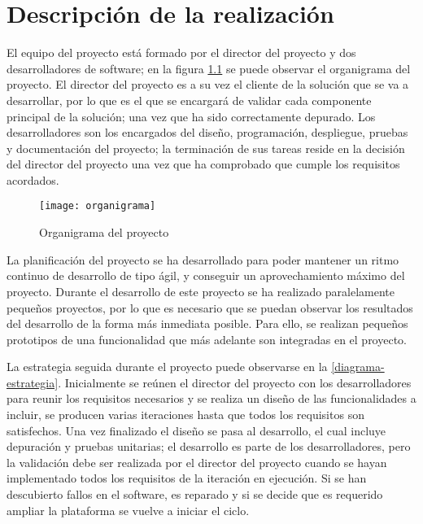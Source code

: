 \chapter{Descripción de la realización}
El equipo del proyecto está formado por el director del proyecto y dos
desarrolladores de software; en la figura \ref{fig:organigrama} se puede
observar el organigrama del proyecto. El director del proyecto es a su vez el
cliente de la solución que se va a desarrollar, por lo que es el que se
encargará de validar cada componente principal de la solución; una vez que ha
sido correctamente depurado. Los desarrolladores son los encargados del diseño,
programación, despliegue, pruebas y documentación del proyecto; la terminación
de sus tareas reside en la decisión del director del proyecto una vez que ha
comprobado que cumple los requisitos acordados.

\begin{figure}[H]
	\begin{center}
		\texttt{[image: organigrama]}
		\caption{Organigrama del proyecto}
		\label{fig:organigrama}
	\end{center}
\end{figure}

La planificación del proyecto se ha desarrollado para poder mantener un ritmo
continuo de desarrollo de tipo ágil, y conseguir un aprovechamiento máximo del
proyecto. Durante el desarrollo de este proyecto se ha realizado paralelamente
pequeños proyectos, por lo que es  necesario que se puedan observar los
resultados del desarrollo de la forma más inmediata posible. Para ello, se
realizan pequeños prototipos de una funcionalidad que más adelante son
integradas en el proyecto.

La estrategia seguida durante el proyecto puede observarse en la
\ref{diagrama-estrategia}. Inicialmente se reúnen el director del proyecto con
los desarrolladores para reunir los requisitos necesarios y se realiza un
diseño de las funcionalidades a incluir, se producen varias iteraciones hasta
que todos los requisitos son satisfechos. Una vez finalizado el diseño se pasa
al desarrollo, el cual incluye depuración y pruebas unitarias; el desarrollo
es parte de los desarrolladores, pero la validación debe ser realizada por el
director del proyecto cuando se hayan implementado todos los requisitos de la
iteración en ejecución. Si se han descubierto fallos en el software, es
reparado y si se decide que es requerido ampliar la plataforma se vuelve a
iniciar el ciclo.

